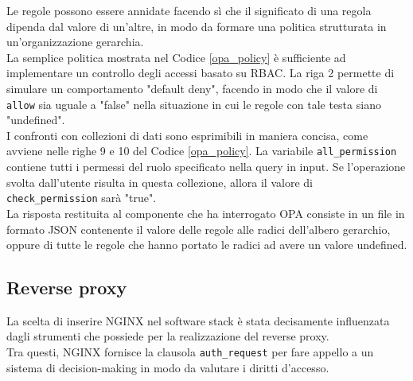 Le regole possono essere annidate facendo sì che il significato di una regola dipenda dal valore di un'altre, in modo da formare una politica strutturata in un'organizzazione gerarchia. 
\\ La semplice politica mostrata nel Codice \ref*{opa_policy} è sufficiente ad implementare 
un controllo degli accessi basato su RBAC. 
La riga 2 permette di simulare un comportamento "default deny", facendo in modo che il valore di \texttt{allow} sia uguale a "false" 
nella situazione in cui le regole con tale testa siano "undefined".  \\ 
I confronti con collezioni di dati sono esprimibili in maniera concisa, come avviene nelle righe 9 e 10 del Codice \ref*{opa_policy}.
La variabile \texttt{all\_permission} contiene tutti i permessi del ruolo specificato nella query in input. 
Se l'operazione svolta dall'utente risulta in questa collezione, allora il valore di \texttt{check\_permission} sarà "true". 
\\ La risposta restituita al componente che ha interrogato OPA consiste in un file in formato JSON contenente il valore 
delle regole alle radici dell'albero gerarchio, oppure di tutte le regole che hanno portato le radici ad avere un valore undefined. 


\subsection{Reverse proxy}
La scelta di inserire NGINX nel software stack è stata decisamente influenzata dagli strumenti che possiede per la realizzazione 
del reverse proxy. 
\\ Tra questi, NGINX fornisce la clausola \texttt{auth\_request} per fare appello a un sistema di decision-making in modo da valutare
i diritti d'accesso. 

